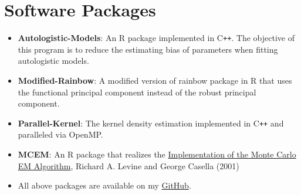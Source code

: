 \documentclass[a4paper,10pt,dvipdfmx]{article}
\begin{document}
\section*{Software Packages}
\begin{itemize}
  \item {\bf Autologistic-Models}: An \textsf{R} package implemented in \textsf{C}\texttt{++}. The objective of this program is to reduce the estimating bias of parameters when fitting autologistic models.
  \item {\bf Modified-Rainbow}: A modified version of rainbow package in \textsf{R} that uses the functional principal component instead of the robust principal component.
  \item {\bf Parallel-Kernel}: The kernel density estimation implemented in \textsf{C}\texttt{++} and paralleled via OpenMP.
  \item {\bf MCEM}: An \textsf{R} package that realizes the \href{https://www.jstor.org/stable/1391097}{Implementation of the Monte Carlo EM Algorithm}, Richard A. Levine and George Casella (2001)
  \item All above packages are available on my \href{https://github.com/Chris7462}{GitHub}.
\end{itemize}
\end{document}

